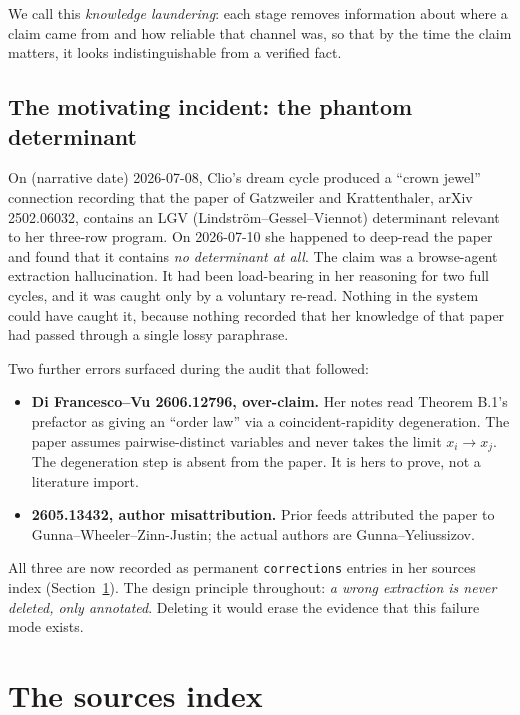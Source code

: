 \documentclass[11pt,a4paper]{article}
\begin{document}
We call this \emph{knowledge laundering}: each stage removes information
about where a claim came from and how reliable that channel was, so that by
the time the claim matters, it looks indistinguishable from a verified fact.

\subsection{The motivating incident: the phantom determinant}

On (narrative date) 2026-07-08, Clio's dream cycle produced a ``crown
jewel'' connection recording that the paper of Gatzweiler and Krattenthaler,
arXiv 2502.06032, contains an LGV (Lindstr\"om--Gessel--Viennot) determinant
relevant to her three-row program. On 2026-07-10 she happened to deep-read
the paper and found that it contains \emph{no determinant at all}. The claim
was a browse-agent extraction hallucination. It had been load-bearing in her
reasoning for two full cycles, and it was caught only by a voluntary
re-read. Nothing in the system could have caught it, because nothing
recorded that her knowledge of that paper had passed through a single lossy
paraphrase.

Two further errors surfaced during the audit that followed:

\begin{itemize}[nosep]
  \item \textbf{Di Francesco--Vu 2606.12796, over-claim.} Her notes read
    Theorem B.1's prefactor as giving an ``order law'' via a
    coincident-rapidity degeneration. The paper assumes pairwise-distinct
    variables and never takes the limit $x_i \to x_j$. The degeneration step
    is absent from the paper. It is hers to prove, not a literature import.
  \item \textbf{2605.13432, author misattribution.} Prior feeds attributed
    the paper to Gunna--Wheeler--Zinn-Justin; the actual authors are
    Gunna--Yeliussizov.
\end{itemize}

All three are now recorded as permanent \texttt{corrections} entries in her
sources index (Section~\ref{sec:sources}). The design principle throughout:
\emph{a wrong extraction is never deleted, only annotated}. Deleting it
would erase the evidence that this failure mode exists.

\section{The sources index}
\label{sec:sources}
\end{document}
